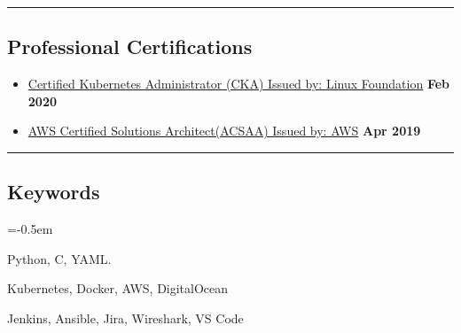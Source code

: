 \documentclass[10pt,letterpaper]{article}
\begin{document}
\hrule
\vspace{-1.0em}
\subsection*{Professional Certifications}
\begin{itemize}
    \parskip=-0.5em
  \item
  {\href{https://training.linuxfoundation.org/certification/certified-kubernetes-administrator-cka/}{Certified Kubernetes Administrator (CKA) Issued by: Linux Foundation}\hfill
      \textbf{Feb 2020}}
  \item
  {\href{https://www.certmetrics.com/amazon/public/badge.aspx?i=1&t=c&d=2019-04-06&ci=AWS00799157}{AWS Certified Solutions Architect(ACSAA) Issued by: AWS}\hfill
      \textbf{Apr 2019}}
\end{itemize}

\hrule
\vspace{-1.0em}
\subsection*{Keywords}
\begin{description}[labelindent=\parindent]
  \parskip=-0.5em
\item[Languages:] Python, C, YAML.
  \item[Infrastructure:] Kubernetes, Docker, AWS, DigitalOcean
  \item[Tools:] Jenkins, Ansible, Jira, Wireshark, VS Code
\end{description}
\end{document}

